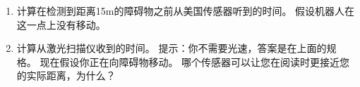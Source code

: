 \begin{enumerate}
\begin{enumerate}
\item 计算在检测到距离15m的障碍物之前从美国传感器听到的时间。 假设机器人在这一点上没有移动。
\item 计算从激光扫描仪收到的时间。 提示：你不需要光速，答案是在上面的规格。
现在假设你正在向障碍物移动。 哪个传感器可以让您在阅读时更接近您的实际距离，为什么？

\end{enumerate}
\end{enumerate}\normalsize